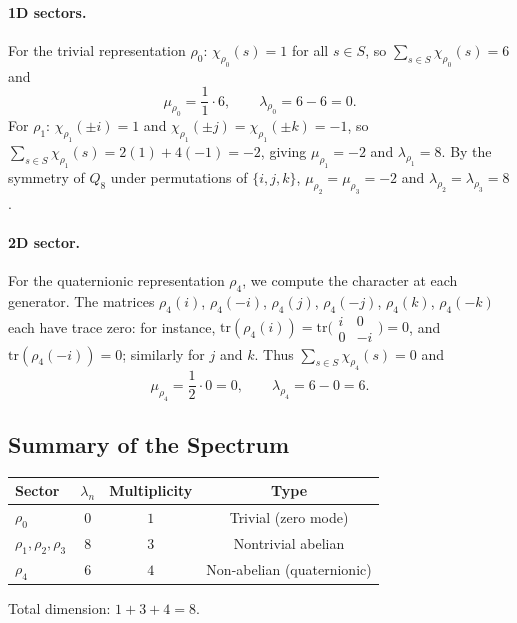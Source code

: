 \documentclass[11pt,a4paper]{article}
\begin{document}
      \paragraph{1D sectors.}
        For the trivial representation $\rho_0$: $\chi_{\rho_0}(s) = 1$ for all $s \in S$,
        so $\sum_{s \in S} \chi_{\rho_0}(s) = 6$ and
      \begin{equation}
        \mu_{\rho_0} = \frac{1}{1} \cdot 6,
        \qquad
        \lambda_{\rho_0} = 6 - 6 = 0.
        \end{equation}
        For $\rho_1$: $\chi_{\rho_1}(\pm i) = 1$ and
        $\chi_{\rho_1}(\pm j) = \chi_{\rho_1}(\pm k) = -1$,
        so $\sum_{s \in S} \chi_{\rho_1}(s) = 2(1) + 4(-1) = -2$, giving
        $\mu_{\rho_1} = -2$ and $\lambda_{\rho_1} = 8$.
        By the symmetry of $Q_8$ under permutations of $\{i,j,k\}$,
        $\mu_{\rho_2} = \mu_{\rho_3} = -2$ and
        $\lambda_{\rho_2} = \lambda_{\rho_3} = 8$.

      \paragraph{2D sector.}
        For the quaternionic representation $\rho_4$, we compute the character at each
        generator.
        The matrices $\rho_4(i)$, $\rho_4(-i)$, $\rho_4(j)$, $\rho_4(-j)$, $\rho_4(k)$,
        $\rho_4(-k)$ each have trace zero: for instance,
        $\mathrm{tr}(\rho_4(i)) =
        \mathrm{tr}\bigl(\begin{smallmatrix}i&0\\0&-i\end{smallmatrix}\bigr) = 0$,
        and $\mathrm{tr}(\rho_4(-i)) = 0$; similarly for $j$ and $k$.
        Thus $\sum_{s \in S} \chi_{\rho_4}(s) = 0$ and
      \begin{equation}
        \mu_{\rho_4} = \frac{1}{2} \cdot 0 = 0,
        \qquad
        \lambda_{\rho_4} = 6 - 0 = 6.
        \end{equation}

  \subsection{Summary of the Spectrum}

    \begin{center}
      \begin{tabular}{lccc}
        \hline
        Sector & $\lambda_n$ & Multiplicity & Type \\
        \hline
        $\rho_0$ & $0$ & $1$ & Trivial (zero mode) \\
        $\rho_1, \rho_2, \rho_3$ & $8$ & $3$ & Nontrivial abelian \\
        $\rho_4$ & $6$ & $4$ & Non-abelian (quaternionic) \\
        \hline
      \end{tabular}
    \end{center}
    Total dimension: $1 + 3 + 4 = 8$. \checkmark
\end{document}
